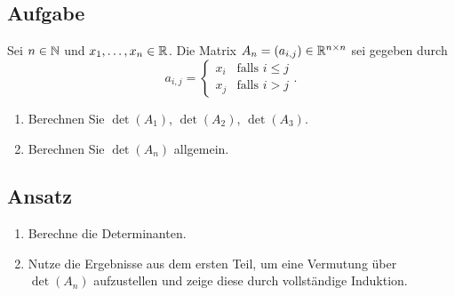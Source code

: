 \subsection{Aufgabe}
Sei \( n \in \mathbb{N} \) und \( x_1, \dots, x_n \in \mathbb{R} \). Die Matrix \( A_n = (a_{i,j}) \in \mathbb{R}^{n \times n} \) sei gegeben durch
\begin{equation*}
	a_{i,j} = \begin{cases}
		x_i &\text{falls } i \leq j \\
		x_j &\text{falls } i > j
	\end{cases}\text{.}
\end{equation*}
\begin{enumerate}
	\item Berechnen Sie \( \det(A_1) \), \( \det(A_2) \), \( \det(A_3) \).
	\item Berechnen Sie \( \det(A_n) \) allgemein. 
\end{enumerate}

\subsection{Ansatz}
\begin{enumerate}
	\item Berechne die Determinanten.
	\item Nutze die Ergebnisse aus dem ersten Teil, um eine Vermutung über \( \det(A_n) \) aufzustellen und zeige diese durch vollständige Induktion. 
\end{enumerate}

